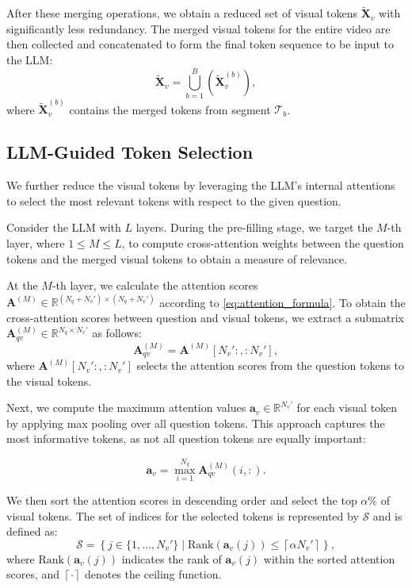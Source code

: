 \documentclass{article} %
\begin{document}
After these merging operations, we obtain a reduced set of visual tokens $\tilde{\bm{X}}_v$ with significantly less redundancy.
The merged visual tokens for the entire video are then collected and concatenated to form the final token sequence to be input to the LLM:
\begin{equation}
    \tilde{\bm{X}}_v = \bigcup_{b=1}^{B} \left( \tilde{\bm{X}}_v^{(b)} \right),
\end{equation}
where $\tilde{\bm{X}}_v^{(b)}$ contains the merged tokens from segment $\mathcal{T}_b$.

\subsection{LLM-Guided Token Selection}

We further reduce the visual tokens by leveraging the LLM's internal attentions to select the most relevant tokens with respect to the given question.

Consider the LLM with $L$ layers. During the pre-filling stage, we target the $M$-th layer, where $1 \leq M \leq L$, to compute cross-attention weights between the question tokens and the merged visual tokens to obtain a measure of relevance.

At the $M$-th layer, we calculate the attention scores $\bm{A}^{(M)} \in \mathbb{R}^{(N_q + N_v') \times (N_q + N_v')}$ according to \cref{eq:attention_formula}. To obtain the cross-attention scores between question and visual tokens, we extract a submatrix $\bm{A}_{qv}^{(M)} \in \mathbb{R}^{N_q \times N_v'}$ as follows:
\begin{equation}
    \bm{A}_{qv}^{(M)} = \bm{A}^{(M)}[N_v':, :N_v'],
\end{equation}
where $\bm{A}^{(M)}[N_v':, :N_v']$ selects the attention scores from the question tokens to the visual tokens.

Next, we compute the maximum attention values $\bm{a}_v \in \mathbb{R}^{N_v'}$ for each visual token by applying max pooling over all question tokens. This approach captures the most informative tokens, as not all question tokens are equally important:

$$ \bm{a}_v = \max_{i=1}^{N_q} \bm{A}_{qv}^{(M)}(i, :). $$

We then sort the attention scores in descending order and select the top $\alpha\%$ of visual tokens. The set of indices for the selected tokens is represented by $\mathcal{S}$ and is defined as:
\begin{equation}
    \mathcal{S} = \left\{ j \in \{1, \dots, N_v'\} \mid \text{Rank} \left( \bm{a}_v(j) \right) \leq \left\lceil \alpha N_v' \right\rceil \right\},
\end{equation}
where $\text{Rank} \left( \bm{a}_v(j) \right)$ indicates the rank of $\bm{a}_v(j)$ within the sorted attention scores, and $\left\lceil \cdot \right\rceil$ denotes the ceiling function.
\end{document}
